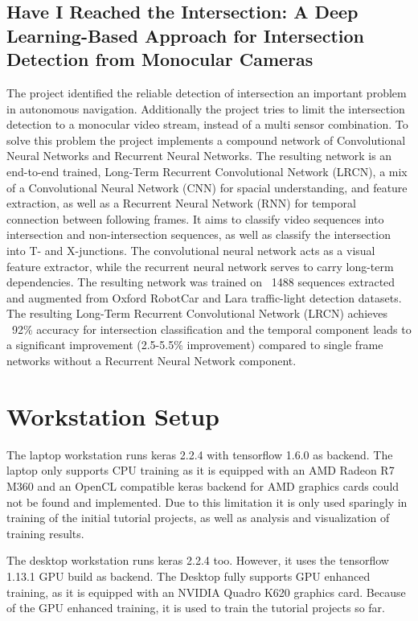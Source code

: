 \documentclass[sigconf]{acmart}
\begin{document}
\subsection{Have  I  Reached  the  Intersection:  A  Deep  Learning-Based  Approach  for Intersection  Detection  from  Monocular  Cameras \cite{IntersectNet}}
The project identified the reliable detection of intersection an important problem in autonomous navigation.
Additionally the project tries to limit the intersection detection to a monocular video stream, instead of a multi sensor combination.
To solve this problem the project implements a compound network of Convolutional Neural Networks and Recurrent Neural Networks.
The resulting network is an end-to-end trained, Long-Term Recurrent Convolutional Network (LRCN), a mix of a Convolutional Neural Network (CNN) for spacial understanding, and feature extraction, as well as a Recurrent Neural Network (RNN) for temporal connection between following frames.
It aims to classify video sequences into intersection and non-intersection sequences, as well as classify the intersection into T- and X-junctions.
The convolutional neural network acts as a visual feature extractor, while the recurrent neural network serves to carry long-term dependencies.
The resulting network was trained on ~1488 sequences extracted and augmented from Oxford RobotCar and Lara traffic-light detection datasets. The resulting Long-Term Recurrent Convolutional Network (LRCN) achieves ~92\% accuracy for intersection classification and the temporal component leads to a significant improvement (2.5-5.5\% improvement) compared to single frame networks without a Recurrent Neural Network component.

\section{Workstation Setup}
The laptop workstation runs keras 2.2.4 with tensorflow 1.6.0 as backend.
The laptop only supports CPU training as it is equipped with an AMD Radeon R7 M360 and an OpenCL compatible keras backend for AMD graphics cards could not be found and implemented.
Due to this limitation it is only used sparingly in training of the initial tutorial projects, as well as analysis and visualization of training results.

The desktop workstation runs keras 2.2.4 too. However, it uses the tensorflow 1.13.1 GPU build as backend.
The Desktop fully supports GPU enhanced training, as it is equipped with an NVIDIA Quadro K620 graphics card.
Because of the GPU enhanced training, it is used to train the tutorial projects so far.
\end{document}
